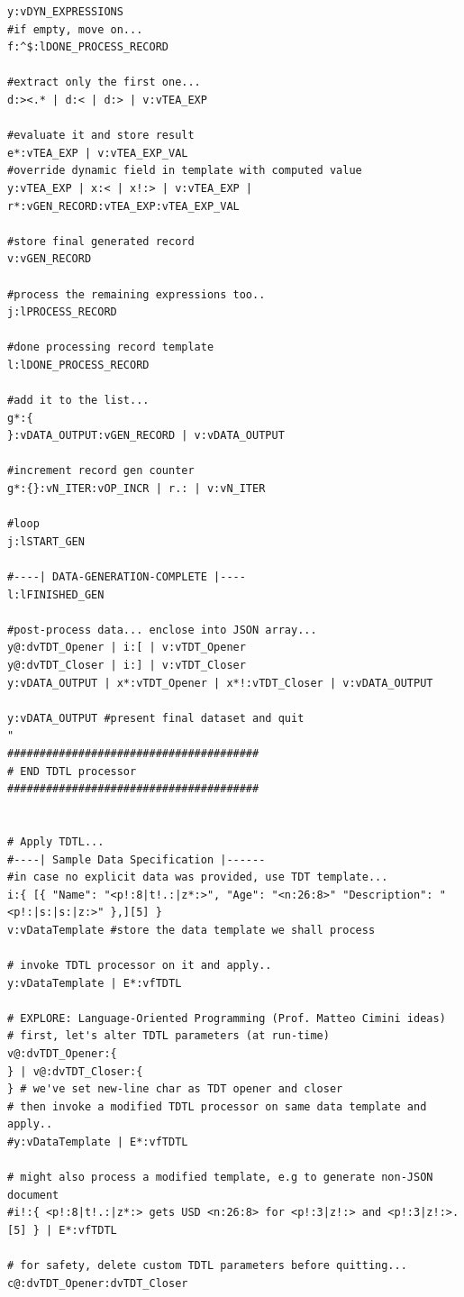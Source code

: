 \documentclass[a4paper, 18pt]{book} %
\begin{document}
{\begin{tcolorbox}[teaterminalstyle, title=TEA Program: TDT Language and LOP Capabilities Demonstration, breakable]
\begin{lstlisting}[language=TEA,breaklines=true,]
y:vDYN_EXPRESSIONS
#if empty, move on...
f:^$:lDONE_PROCESS_RECORD

#extract only the first one...
d:><.* | d:< | d:> | v:vTEA_EXP 

#evaluate it and store result
e*:vTEA_EXP | v:vTEA_EXP_VAL
#override dynamic field in template with computed value
y:vTEA_EXP | x:< | x!:> | v:vTEA_EXP | r*:vGEN_RECORD:vTEA_EXP:vTEA_EXP_VAL

#store final generated record
v:vGEN_RECORD

#process the remaining expressions too..
j:lPROCESS_RECORD

#done processing record template
l:lDONE_PROCESS_RECORD

#add it to the list...
g*:{
}:vDATA_OUTPUT:vGEN_RECORD | v:vDATA_OUTPUT

#increment record gen counter
g*:{}:vN_ITER:vOP_INCR | r.: | v:vN_ITER

#loop
j:lSTART_GEN

#----| DATA-GENERATION-COMPLETE |----
l:lFINISHED_GEN

#post-process data... enclose into JSON array...
y@:dvTDT_Opener | i:[ | v:vTDT_Opener
y@:dvTDT_Closer | i:] | v:vTDT_Closer
y:vDATA_OUTPUT | x*:vTDT_Opener | x*!:vTDT_Closer | v:vDATA_OUTPUT 

y:vDATA_OUTPUT #present final dataset and quit
"
#######################################
# END TDTL processor
#######################################


# Apply TDTL...
#----| Sample Data Specification |------
#in case no explicit data was provided, use TDT template...
i:{ [{ "Name": "<p!:8|t!.:|z*:>", "Age": "<n:26:8>" "Description": "<p!:|s:|s:|z:>" },][5] }
v:vDataTemplate #store the data template we shall process

# invoke TDTL processor on it and apply..
y:vDataTemplate | E*:vfTDTL

# EXPLORE: Language-Oriented Programming (Prof. Matteo Cimini ideas)
# first, let's alter TDTL parameters (at run-time)
v@:dvTDT_Opener:{
} | v@:dvTDT_Closer:{
} # we've set new-line char as TDT opener and closer
# then invoke a modified TDTL processor on same data template and apply..
#y:vDataTemplate | E*:vfTDTL

# might also process a modified template, e.g to generate non-JSON document
#i!:{ <p!:8|t!.:|z*:> gets USD <n:26:8> for <p!:3|z!:> and <p!:3|z!:>.[5] } | E*:vfTDTL

# for safety, delete custom TDTL parameters before quitting...
c@:dvTDT_Opener:dvTDT_Closer
   \end{lstlisting}
  \end{tcolorbox}
  \label{FIGNEX1b}
  \vspace{1cm}


}
\end{document}
